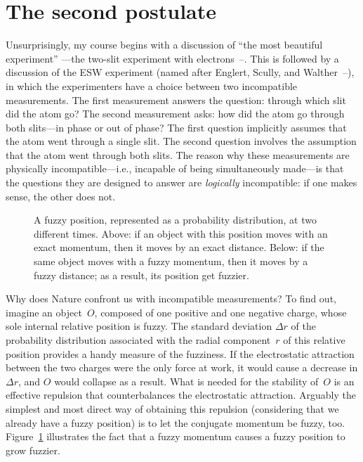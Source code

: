 \documentclass[12pt]{article}
\begin{document}
\section{The second postulate}
\label{SecAxiom2}Unsurprisingly, my course begins with a discussion of ``the most beautiful experiment'' \cite{Crease}---the two-slit experiment with electrons~\cite{FLS}--\cite{Tonomura}. This is followed by a discussion of the ESW experiment (named after Englert, Scully, and Walther~\cite{SEW}--\cite{Mohrhoff99}), in which the experimenters have a choice between two incompatible measurements. The first measurement answers the question: through which slit did the atom go? The second measurement asks: how did the atom go through both slits---in phase or out of phase? The first question implicitly assumes that the atom went through a single slit. The second question involves the assumption that the atom went through both slits. The reason why these measurements are physically incompatible---i.e., incapable of being simultaneously made---is that the questions they are designed to answer are \textit{logically} incompatible: if one makes sense, the other does not.
\begin{figure}[t]
\begin{center}
\end{center}
\caption{A fuzzy position, represented as a probability distribution, at two different times. Above: if an object with this position moves with an exact momentum, then it moves by an exact distance. Below: if the same object moves with a fuzzy momentum, then it moves by a fuzzy distance; as a result, its position get fuzzier.}
\label{FIGuncty}
\end{figure}

Why does Nature confront us with incompatible measurements? To find out, imagine an object~$O$, composed of one positive and one negative charge, whose sole internal relative position is fuzzy. The standard deviation $\Delta r$ of the probability distribution associated with the radial component~$r$ of this relative position provides a handy measure of the fuzziness. If the electrostatic attraction between the two charges were the only force at work, it would cause a decrease in $\Delta r$, and $O$ would collapse as a result. What is needed for the stability of~$O$ is an effective repulsion that counterbalances the electrostatic attraction. Arguably the simplest and most direct way of obtaining this repulsion (considering that we already have a fuzzy position) is to let the conjugate momentum be fuzzy, too. Figure~\ref{FIGuncty} illustrates the fact that a fuzzy momentum causes a fuzzy position to grow fuzzier.
\end{document}
